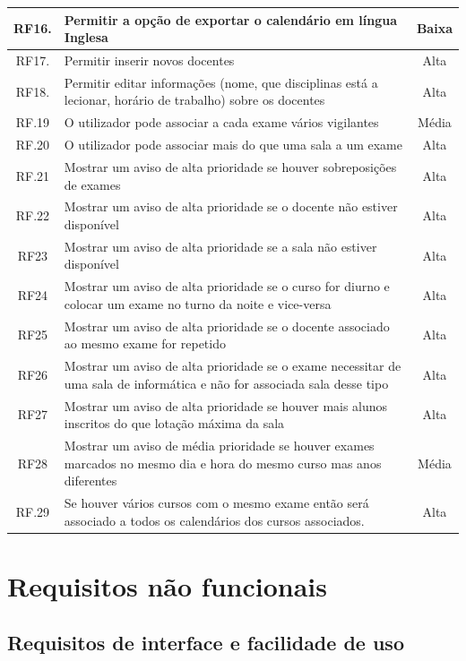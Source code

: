 \documentclass[11pt, twoside]{report}
\begin{document}
\begin{table}[H]
\begin{center}
\begin{tabularx}{\textwidth}{|c|X|c|}
			RF16. & Permitir a opção de exportar o calendário em língua Inglesa & Baixa \\
			\hline
			RF17. & Permitir inserir novos docentes & Alta\\
			\hline
			RF18. & Permitir editar informações (nome, que disciplinas está a lecionar, horário de trabalho) sobre os docentes & Alta\\
			\hline
			RF.19 &O utilizador pode associar a cada exame vários vigilantes & Média\\
			\hline
			RF.20 &	O utilizador pode associar mais do que uma sala a um exame & Alta\\
			\hline
			RF.21 &Mostrar um aviso de alta prioridade se houver sobreposições de exames & Alta\\
			\hline
			RF.22 & Mostrar um aviso de alta prioridade se o docente não estiver disponível & Alta \\
			\hline
			RF23 & Mostrar um aviso de alta prioridade se a sala não estiver disponível & Alta\\
			\hline
			RF24 & Mostrar um aviso de alta prioridade se o curso for diurno e colocar um exame no turno da noite e vice-versa & Alta\\
			\hline
			RF25&Mostrar um aviso de alta prioridade se o docente associado ao mesmo exame for repetido & Alta \\
			\hline
			RF26 & Mostrar um aviso de alta prioridade se o exame necessitar de uma sala de informática e não for associada sala desse tipo & Alta\\
			\hline
			RF27 & Mostrar um aviso de alta prioridade se houver mais alunos inscritos do que  lotação máxima da sala & Alta\\
			\hline
			RF28 & Mostrar um aviso de média prioridade se houver exames marcados no mesmo dia e hora do mesmo curso mas anos diferentes & Média\\
			\hline
			RF.29 & Se houver vários cursos com o mesmo exame então será associado a todos os calendários dos cursos associados. & Alta\\
			\hline
		\end{tabularx}
	\end{center}
\end{table}



	
	\section{Requisitos não funcionais}
	\subsection{Requisitos de interface e facilidade de uso}
\end{document}
